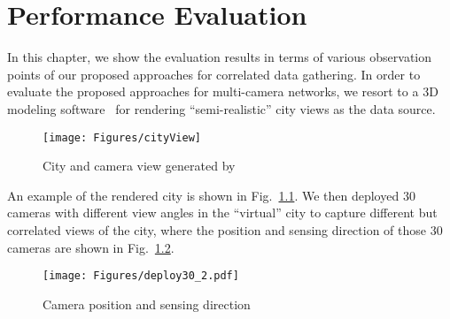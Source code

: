\chapter{Performance Evaluation}
\label{sec::evaluation}
In this chapter, we show the evaluation results in terms of various observation points of our proposed approaches for correlated data gathering.
In order to evaluate the proposed approaches for multi-camera networks, we resort to a 3D modeling software~\cite{Suicidator,Blender} for rendering ``semi-realistic'' city views as the data source.
%
\begin{figure}
\begin{center}
\texttt{[image: Figures/cityView]}
\caption{\label{fig::cityView}City and camera view generated by~\cite{Suicidator,Blender}}
\end{center}
\end{figure}
%
An example of the rendered city is shown in Fig.~\ref{fig::cityView}.
We then deployed $30$ cameras with different view angles in the ``virtual'' city to capture different but correlated views of the city, where the position and sensing direction of those $30$ cameras are shown in Fig.~\ref{fig::deploy30}.
%
\begin{figure}
\begin{center}
\texttt{[image: Figures/deploy30\_2.pdf]}
\caption{\label{fig::deploy30}Camera position and sensing direction}
\end{center}
\end{figure}
%

